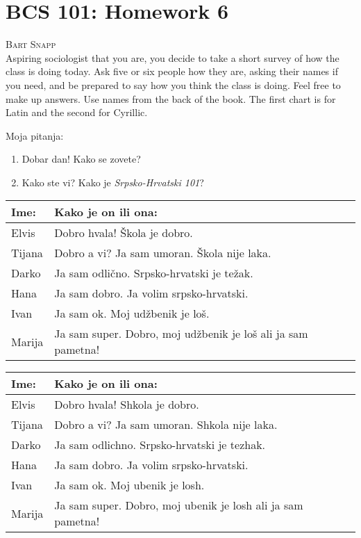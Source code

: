 \documentclass[11pt]{article}
\newcommand\textcyr[1]{{\fontencoding{OT2}\fontfamily{wncyr}\selectfont #1}}
\begin{document}
\section*{BCS 101: Homework 6} 
\noindent\textsc{Bart Snapp} \\                                                 

\noindent
Aspiring sociologist that you are, you decide to take a short survey
of how the class is doing today.  Ask five or six people how they are,
asking their names if you need, and be prepared to say how you think
the class is doing. Feel free to make up answers. Use names from the
back of the book. The first chart is for Latin and the second for
Cyrillic.

\vspace{1cm}
\noindent
Moja pitanja:
\begin{enumerate}
\item Dobar dan! Kako se zovete?
\item Kako ste vi? Kako je \textit{Srpsko-Hrvatski 101}?
\end{enumerate}
{
\renewcommand{\arraystretch}{1.5}
\begin{tabular}{|l|l|}\hline
Ime: & Kako je on ili ona: \\ \hline\hline
Elvis & Dobro hvala! \v Skola je dobro. \\ \hline
Tijana & Dobro a vi? Ja sam umoran. \v Skola nije laka. \\ \hline
Darko & Ja sam odli\v cno. Srpsko-hrvatski je te\v zak.\\ \hline
Hana & Ja sam dobro. Ja volim srpsko-hrvatski. \\ \hline
Ivan & Ja sam ok. Moj ud\v zbenik je lo\v s.\\ \hline
Marija & Ja sam super. Dobro, moj ud\v zbenik je lo\v s ali ja sam pametna! \\ \hline
\end{tabular}
}

\vspace{1cm}


\textcyr{\cyracc
{
\renewcommand{\arraystretch}{1.5}
\noindent
\begin{tabular}{|l|l|}\hline
Ime: & Kako je on ili ona: \\ \hline\hline
Elvis & Dobro hvala! Shkola je dobro. \\ \hline
Tijana & Dobro a vi? Ja sam umoran. Shkola nije laka. \\ \hline
Darko & Ja sam odlichno. Srpsko-hrva{t}{s}ki je tezhak.\\ \hline
Hana & Ja sam dobro. Ja volim srpsko-hrva{t}{s}ki. \\ \hline
Ivan & Ja sam ok. Moj u\dzh benik je losh.\\ \hline
Marija & Ja sam super. Dobro, moj u\dzh benik je losh ali ja sam pametna! \\ \hline
\end{tabular}
}
}
\end{document}
